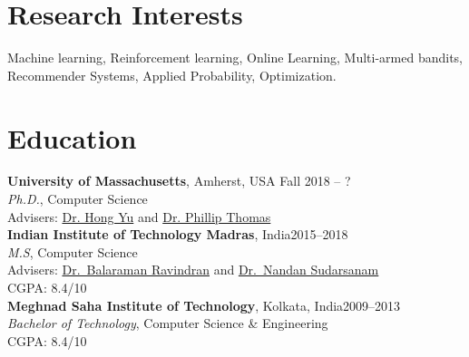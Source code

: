 \documentclass[margin,11pt]{res}
\begin{document}
\begin{resume}

\section{Research Interests}

Machine learning, Reinforcement learning, Online Learning, Multi-armed bandits, Recommender Systems, Applied Probability, Optimization.

%


\section{Education}
\textbf{University of Massachusetts}, Amherst, USA \hfill Fall 2018 -- ?\\
{\sl Ph.D.}, Computer Science \\
Advisers: \href{https://scholar.google.com/citations?user=TyXe64wAAAAJ&hl=en}{Dr. Hong Yu} and \href{https://people.cs.umass.edu/~pthomas/}{Dr. Phillip Thomas}
\\[0.25cm]
\textbf{Indian Institute of Technology Madras}, India\hfill 2015--2018 \\
{\sl M.S}, Computer Science \\
Advisers: \href{https://www.cse.iitm.ac.in/~ravi/}{Dr.~Balaraman Ravindran} and \href{https://doms.iitm.ac.in/index.php/nandan-s}{Dr.~Nandan Sudarsanam}\\ CGPA: 8.4/10
\\[0.25cm]
\textbf{Meghnad Saha Institute of Technology}, Kolkata, India\hfill 2009--2013\\
{\sl Bachelor of Technology}, Computer Science \& Engineering\\ CGPA: 8.4/10

\end{resume}
\end{document}
